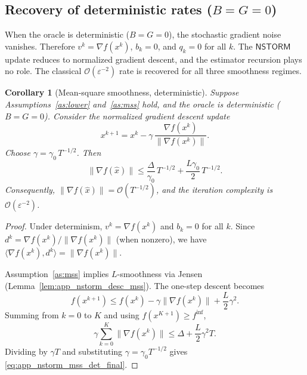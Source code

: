 \documentclass[letter,11pt]{article}
\newtheorem{corollary}{Corollary}[theorem]
\newcommand{\Ocal}{\mathcal{O}}
\begin{document}
\subsection{Recovery of deterministic rates (\texorpdfstring{$B=G=0$}{B=G=0})}
\label{app:nstorm_det_recovery}

When the oracle is deterministic ($B=G=0$), the stochastic gradient noise
vanishes. Therefore $v^k=\nabla f(x^k)$, $b_k=0$, and $q_k=0$ for all $k$.
The $\mathsf{NSTORM}$ update reduces to normalized gradient descent, and the
estimator recursion plays no role. The classical $\Ocal(\varepsilon^{-2})$
rate is recovered for all three smoothness regimes.

\begin{corollary}[Mean-square smoothness, deterministic]
\label{cor:app_nstorm_mss_det}
Suppose Assumptions~\ref{as:lower} and~\ref{as:mss} hold, and the oracle is
deterministic ($B=G=0$). Consider the normalized gradient descent update
\[
    x^{k+1} = x^k - \gamma\,\frac{\nabla f(x^k)}{\|\nabla f(x^k)\|}.
\]
Choose $\gamma = \gamma_0\,T^{-1/2}$. Then
\begin{equation}
\label{eq:app_nstorm_mss_det_final}
    \|\nabla f(\widehat x)\|
    \le
    \frac{\Delta}{\gamma_0}\,T^{-1/2}
    + \frac{L\gamma_0}{2}\,T^{-1/2}.
\end{equation}
Consequently,
$\|\nabla f(\widehat x)\| = \Ocal(T^{-1/2})$,
and the iteration complexity is $\Ocal(\varepsilon^{-2})$.
\end{corollary}

\begin{proof}
Under determinism, $v^k=\nabla f(x^k)$ and $b_k=0$ for all $k$. Since
$d^k=\nabla f(x^k)/\|\nabla f(x^k)\|$ (when nonzero), we have
$\langle\nabla f(x^k),d^k\rangle=\|\nabla f(x^k)\|$.

Assumption~\ref{as:mss} implies $L$-smoothness via Jensen
(Lemma~\ref{lem:app_nstorm_desc_mss}). The one-step descent becomes
\[
    f(x^{k+1})
    \le f(x^k)
    - \gamma\|\nabla f(x^k)\|
    + \frac{L}{2}\gamma^2.
\]
Summing from $k=0$ to $K$ and using $f(x^{K+1})\ge f^{\inf}$,
\[
    \gamma\sum_{k=0}^{K}\|\nabla f(x^k)\|
    \le \Delta + \frac{L}{2}\gamma^2 T.
\]
Dividing by $\gamma T$ and substituting $\gamma=\gamma_0 T^{-1/2}$ gives
\eqref{eq:app_nstorm_mss_det_final}.
\end{proof}
\end{document}
